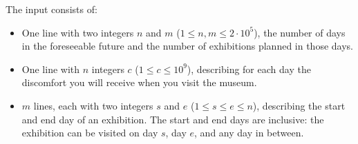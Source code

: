 
    The input consists of:
    \begin{itemize}
        \item One line with two integers $n$ and $m$ ($1\leq n,m\leq 2\cdot10^5$),
            the number of days in the foreseeable future and the number of exhibitions planned in those days.
        \item One line with $n$ integers $c$ ($1\leq c\leq 10^9$),
            describing for each day the discomfort you will receive when you visit the museum.
        \item $m$ lines, each with two integers $s$ and $e$ ($1\leq s\leq e\leq n$),
            describing the start and end day of an exhibition.
            The start and end days are inclusive: the exhibition can be visited on day $s$, day $e$, and any day in between.
    \end{itemize}
